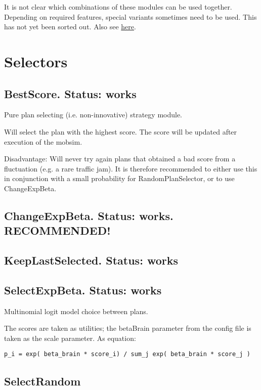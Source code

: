 \documentclass[a4paper,11pt]{report}
\begin{document}
It is not clear which combinations of these modules can be used  together. Depending on required features, special variants sometimes  need to be used. This has not yet been sorted out. Also see \href{http://matsim.org/node/690}{here}.


\vfill\eject
\section{Selectors}

\subsection{BestScore.  Status: works}

Pure plan selecting (i.e. non-innovative) strategy module.

Will select the plan with the highest score. The score will be updated after execution of the mobsim.

Disadvantage: Will never try again plans that obtained a bad score  from a fluctuation (e.g. a rare traffic jam). It is therefore  recommended to either use this in conjunction with a small probability  for RandomPlanSelector, or to use ChangeExpBeta.

\subsection{ChangeExpBeta. Status: works. RECOMMENDED!}

\subsection{KeepLastSelected. Status: works}

\subsection{SelectExpBeta. Status: works}

Multinomial logit model choice between plans.

The scores are taken as utilities; the betaBrain parameter from the  config file is taken as the scale parameter. As equation:
\begin{verbatim}
p_i = exp( beta_brain * score_i) / sum_j exp( beta_brain * score_j )
\end{verbatim}

\subsection{SelectRandom}
\end{document}
